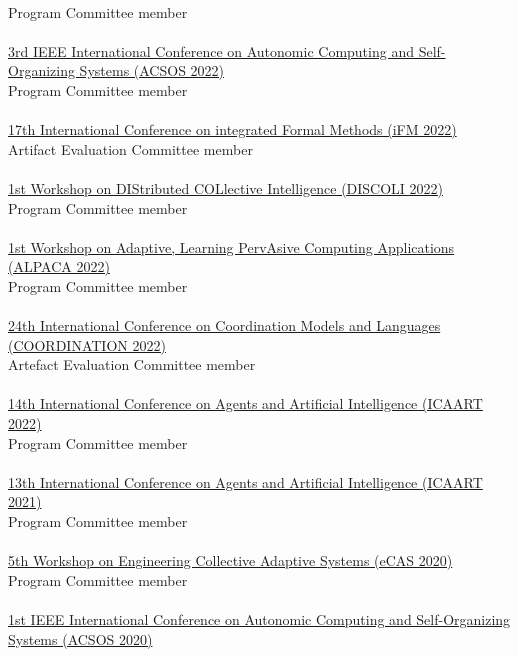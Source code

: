 \\ Program Committee member \\
\halfblankline \\
\href{https://conf.researchr.org/home/acsos-2022/}{3rd IEEE International Conference on Autonomic Computing and Self-Organizing Systems
(ACSOS 2022)}
\\ Program Committee member \\
\halfblankline \\
\href{https://ifm22.si.usi.ch/}{17th International Conference on integrated Formal Methods
(iFM 2022)}
\\ Artifact Evaluation Committee member \\
\halfblankline \\
\href{https://discoli-workshop.github.io/2022/}{1st Workshop on DIStributed COLlective Intelligence
(DISCOLI 2022)}
\\ Program Committee member \\
\halfblankline \\
\href{https://www.discotec.org/2022/coordination}{1st Workshop on Adaptive, Learning PervAsive Computing Applications
(ALPACA 2022)}
\\ Program Committee member \\
\halfblankline \\
\href{https://www.discotec.org/2022/coordination}{24th International Conference on Coordination Models and Languages 
(COORDINATION 2022)}
\\ Artefact Evaluation Committee member \\
\halfblankline \\
\href{http://www.icaart.org/?y=2022}{14th International Conference on Agents and Artificial Intelligence 
(ICAART 2022)}
\\ Program Committee member \\
\halfblankline \\
\href{http://www.icaart.org/?y=2021}{13th International Conference on Agents and Artificial Intelligence 
(ICAART 2021)}
\\ Program Committee member \\
\halfblankline \\
\href{http://archive.vn/wip/38Ah6}{5th Workshop on Engineering Collective Adaptive Systems (eCAS 2020)}
\\ Program Committee member \\
\halfblankline \\
\href{https://conf.researchr.org/home/acsos-2020}{1st IEEE International Conference on Autonomic Computing and Self-Organizing Systems (ACSOS 2020)}
